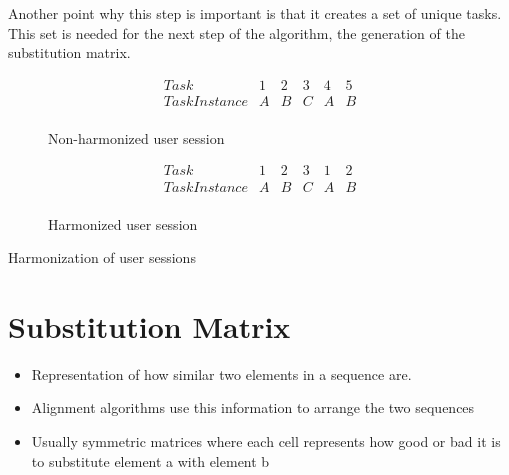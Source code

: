 Another point why this step is important is that it creates a set of unique tasks. This set is needed for the next step of the algorithm, the generation of the substitution matrix.

\begin{figure}[h]
\[
\begin{array}{r|ccccc}
	Task & 1 & 2 & 3 & 4 & 5\\
	\hline
	TaskInstance & A & B & C & A & B\\
\end{array} 
\]
\caption{Non-harmonized user session}
\label{fig:nonharmonized}
\end{figure}

\begin{figure}[h]
\[
\begin{array}{r|ccccc}
	Task & 1 & 2 & 3 & 1 & 2\\
	\hline
	TaskInstance & A & B & C & A & B\\
\end{array} 
\]
\caption{Harmonized user session}
\label{fig:harmonized}
\end{figure}

\begin{algorithm}[h]
\begin{algorithmic}
			\Else 
			\EndIf
		 \EndFor
	 \EndFor
	\EndProcedure
\end{algorithmic}
\caption{Harmonization of user sessions}
\label{alg:harmonize}
\end{algorithm}

\section{Substitution Matrix}
	\begin{itemize}
		\item Representation of how similar two elements in a sequence are. 
		\item Alignment algorithms use this information to arrange the two sequences 
		\item Usually symmetric matrices where each cell represents how good or bad it is to substitute element a with element b  
	\end{itemize}
